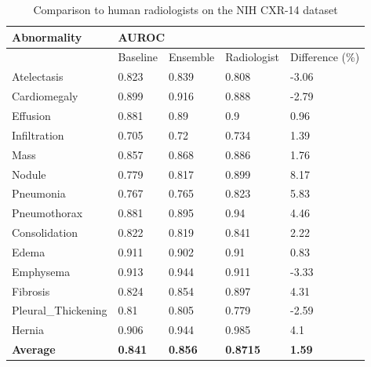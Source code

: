 \documentclass[8pt]{beamer}
\begin{document}
\begin{frame}
  \begin{table}[]
    \centering
    \begin{tabular}{lllll}
      \hline
      \textbf{Abnormality} & \multicolumn{4}{l}{\textbf{AUROC}}             \\ \hline
                           & Baseline & Ensemble & Radiologist & Difference (\%) \\ \hline
      Atelectasis          & 0.823    & 0.839    & 0.808       & -3.06      \\ \hline
      Cardiomegaly         & 0.899    & 0.916    & 0.888       & -2.79      \\ \hline
      Effusion             & 0.881    & 0.89     & 0.9         & 0.96       \\ \hline
      Infiltration         & 0.705    & 0.72     & 0.734       & 1.39       \\ \hline
      Mass                 & 0.857    & 0.868    & 0.886       & 1.76       \\ \hline
      Nodule               & 0.779    & 0.817    & 0.899       & 8.17       \\ \hline
      Pneumonia            & 0.767    & 0.765    & 0.823       & 5.83       \\ \hline
      Pneumothorax         & 0.881    & 0.895    & 0.94        & 4.46       \\ \hline
      Consolidation        & 0.822    & 0.819    & 0.841       & 2.22       \\ \hline
      Edema                & 0.911    & 0.902    & 0.91        & 0.83       \\ \hline
      Emphysema            & 0.913    & 0.944    & 0.911       & -3.33      \\ \hline
      Fibrosis             & 0.824    & 0.854    & 0.897       & 4.31       \\ \hline
      Pleural\_Thickening  & 0.81     & 0.805    & 0.779       & -2.59      \\ \hline
      Hernia               & 0.906    & 0.944    & 0.985       & 4.1        \\ \hline
      \textbf{Average}              & \textbf{0.841}    & \textbf{0.856}    & \textbf{0.8715}      & \textbf{1.59}       \\ \hline
    \end{tabular}
    \caption{Comparison to human radiologists on the NIH CXR-14 dataset}
    \label{tab:nih_comparision}
  \end{table}


\end{frame}
\end{document}
